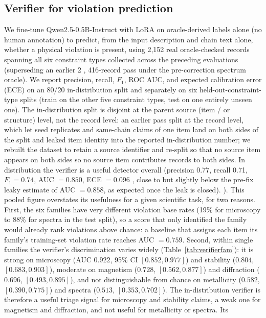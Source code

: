 \documentclass[pdflatex,sn-nature]{sn-jnl}
\newcommand{\rev}[1]{#1} %
\newcommand{\rev}[1]{{\color{blue}#1}} %
\providecommand{\DIFadd}[1]{{\protect\color{blue} \sf #1}} %
\providecommand{\DIFdel}[1]{{\protect\color{red} \scriptsize #1}} %
\providecommand{\DIFaddbegin}{} %
\providecommand{\DIFaddend}{} %
\providecommand{\DIFdelbegin}{} %
\providecommand{\DIFdelend}{} %
\providecommand{\DIFscaledelfig}{0.5}
\newlength{\DIFdelgraphicswidth} %
\newlength{\DIFdelgraphicsheight} %
\providecommand{\DIFaddincludegraphics}[2][]{{\color{blue}\fbox{\DIFOincludegraphics[#1]{#2}}}} %
\providecommand{\DIFdelincludegraphics}[2][]{%
\sbox{\DIFdelgraphicsbox}{\DIFOincludegraphics[#1]{#2}}%
\settoboxwidth{\DIFdelgraphicswidth}{\DIFdelgraphicsbox} %
\settoboxtotalheight{\DIFdelgraphicsheight}{\DIFdelgraphicsbox} %
\scalebox{\DIFscaledelfig}{%
\parbox[b]{\DIFdelgraphicswidth}{\usebox{\DIFdelgraphicsbox}\\[-\baselineskip] \rule{\DIFdelgraphicswidth}{0em}}\llap{\resizebox{\DIFdelgraphicswidth}{\DIFdelgraphicsheight}{%
\setlength{\unitlength}{\DIFdelgraphicswidth}%
\begin{picture}(1,1)%
\thicklines\linethickness{2pt} %
{\color[rgb]{1,0,0}\put(0,0){\framebox(1,1){}}}%
{\color[rgb]{1,0,0}\put(0,0){\line( 1,1){1}}}%
{\color[rgb]{1,0,0}\put(0,1){\line(1,-1){1}}}%
\end{picture}%
}\hspace*{3pt}}} %
} %
\DeclareRobustCommand{\DIFaddbegin}{\DIFOaddbegin \let\includegraphics\DIFaddincludegraphics} %
\DeclareRobustCommand{\DIFaddend}{\DIFOaddend \let\includegraphics\DIFOincludegraphics} %
\DeclareRobustCommand{\DIFdelbegin}{\DIFOdelbegin \let\includegraphics\DIFdelincludegraphics} %
\DeclareRobustCommand{\DIFdelend}{\DIFOaddend \let\includegraphics\DIFOincludegraphics} %
\begin{document}
\DIFaddend \subsection*{Verifier for violation prediction}
We fine-tune Qwen2.5-0.5B-Instruct with LoRA on oracle-derived labels alone (no human
annotation) to predict, from the input description and chain text alone, whether a
physical violation is present, using 2{,}152 real oracle-checked records spanning all
six constraint types collected across the preceding evaluations\DIFdelbegin \DIFdel{(superseding an earlier
2}%
\DIFdel{,}%
\DIFdel{416-record pass under the pre-correction spectrum oracle)}\DIFdelend . We report precision,
recall, $F_1$, ROC AUC, and expected calibration error (ECE) on an 80/20
in-distribution split and separately on six held-out-constraint-type splits (train on the
other five constraint types, test on one entirely unseen one). The in-distribution split
is disjoint at the parent source (item \DIFdelbegin \DIFdel{/}\DIFdelend \DIFaddbegin \DIFadd{or }\DIFaddend structure) level, \DIFdelbegin \DIFdel{not the record level: an earlier
pass split at the record level, which let seed replicates and same-chain claims of one item
land on both sides of the split and leaked item identity into the reported in-distribution
number; we rebuilt the dataset to retain a source identifier and re-split so that no source
item appears on both sides}\DIFdelend \DIFaddbegin \DIFadd{\rev{so no source item contributes
records to both sides}}\DIFaddend . In distribution the verifier is a useful
detector \DIFaddbegin \DIFadd{overall }\DIFaddend (precision 0.77, recall 0.71, $F_1=0.74$, AUC $=0.850$, ECE $=0.096$\DIFdelbegin \DIFdel{, close to but
slightly below the pre-fix leaky estimate of AUC $=0.858$, as expected once the leak is
closed).
}\DIFdelend \DIFaddbegin \DIFadd{).
\rev{This pooled figure overstates its usefulness for a given scientific task, for two reasons.
First, the six families have very different violation base rates (19\% for microscopy to 88\%
for spectra in the test split), so a score that only identified the family would already rank
violations above chance: a baseline that assigns each item its family's training-set violation
rate reaches AUC $=0.759$. Second, within single families the verifier's discrimination varies
widely (Table~\ref{tab:verifierfam}): it is strong on microscopy (AUC $0.922$, 95\% CI
$[0.852,0.977]$) and stability ($0.804$, $[0.683,0.903]$), moderate on magnetism ($0.728$,
$[0.562,0.877]$) and diffraction ($0.696$, $[0.493,0.895]$), and not distinguishable from chance on
metallicity ($0.582$, $[0.390,0.775]$) and spectra ($0.513$, $[0.353,0.702]$). The in-distribution
verifier is therefore a useful triage signal for microscopy and stability claims, a weak one for
magnetism and diffraction, and not useful for metallicity or spectra.} }\DIFaddend Its
\end{document}
